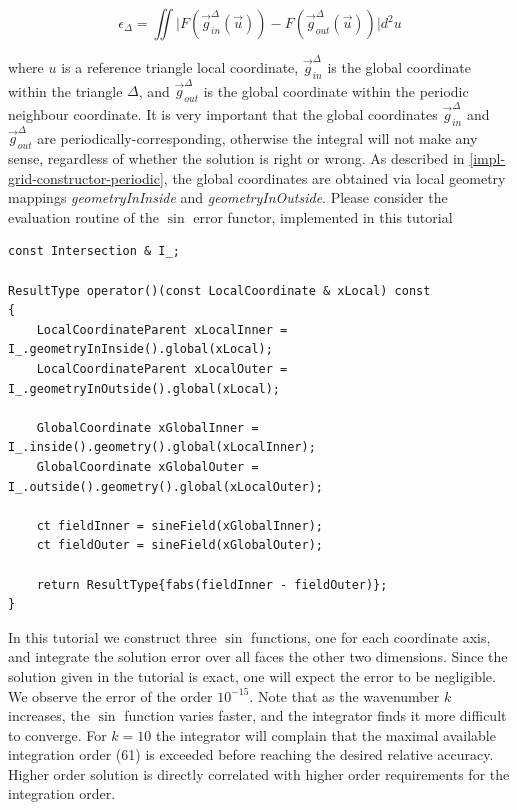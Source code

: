 \[
  \epsilon_\Delta = \iint \biggl | F(\vec{g}^{\Delta}_{in}(\vec{u})) - F(\vec{g}^{\Delta}_{out}(\vec{u})) \biggr | d^2u
\]

\noindent
where $u$ is a reference triangle local coordinate, $\vec{g}^{\Delta}_{in}$ is the global coordinate within the triangle $\Delta$, and $\vec{g}^{\Delta}_{out}$ is the global coordinate within the periodic neighbour coordinate. It is very important that the global coordinates $\vec{g}^{\Delta}_{in}$ and $\vec{g}^{\Delta}_{out}$ are periodically-corresponding, otherwise the integral will not make any sense, regardless of whether the solution is right or wrong. As described in \cref{impl-grid-constructor-periodic}, the global coordinates are obtained via local geometry mappings \textit{geometryInInside} and \textit{geometryInOutside}. Please consider the evaluation routine of the $\sin$ error functor, implemented in this tutorial

\begin{mybox}
\begin{lstlisting}
const Intersection & I_;

ResultType operator()(const LocalCoordinate & xLocal) const
{
    LocalCoordinateParent xLocalInner = I_.geometryInInside().global(xLocal);
    LocalCoordinateParent xLocalOuter = I_.geometryInOutside().global(xLocal);

    GlobalCoordinate xGlobalInner = I_.inside().geometry().global(xLocalInner);
    GlobalCoordinate xGlobalOuter = I_.outside().geometry().global(xLocalOuter);

    ct fieldInner = sineField(xGlobalInner);
    ct fieldOuter = sineField(xGlobalOuter);

    return ResultType{fabs(fieldInner - fieldOuter)};
}
\end{lstlisting}
\end{mybox}

\noindent
In this tutorial we construct three $\sin$ functions, one for each coordinate axis, and integrate the solution error over all faces the other two dimensions. Since the solution given in the tutorial is exact, one will expect the error to be negligible. We observe the error of the order $10^{-15}$. Note that as the wavenumber $k$ increases, the $\sin$ function varies faster, and the integrator finds it more difficult to converge. For $k=10$ the integrator will complain that the maximal available integration order (61) is exceeded before reaching the desired relative accuracy. Higher order solution is directly correlated with higher order requirements for the integration order.














